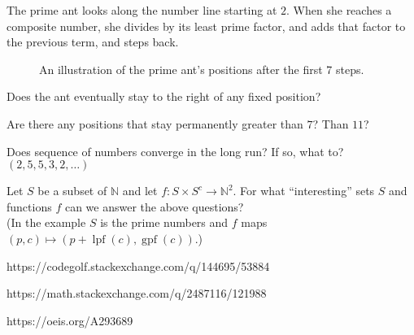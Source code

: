 \documentclass{article}
\begin{document}
The prime ant looks along the number line starting at $2$. When she reaches a
composite number, she divides by its least prime factor, and adds that factor to
the previous term, and steps back.

\begin{figure}[!h]
  \centering
  \caption{An illustration of the prime ant's positions after the first 7 steps.}
\end{figure}

\begin{question}
  Does the ant eventually stay to the right of any fixed position?
\end{question}
\begin{related}
  \item Are there any positions that stay permanently greater than $7$? Than $11$?
  \item Does sequence of numbers converge in the long run? If so, what to?
    $(2, 5, 5, 3, 2, \hdots)$
  \item Let $S$ be a subset of $\mathbb{N}$ and let
    $f: S\times S^{c} \rightarrow \mathbb{N}^2$.
    For what ``interesting'' sets $S$ and functions $f$ can we answer the above
    questions?\\
    (In the example $S$ is the prime numbers and $f$ maps
    $(p, c) \mapsto (p + \operatorname{lpf}(c), \operatorname{gpf}(c))$.)
\end{related}
\begin{references}
  \item https://codegolf.stackexchange.com/q/144695/53884
  \item https://math.stackexchange.com/q/2487116/121988
  \item https://oeis.org/A293689
\end{references}
\end{document}
